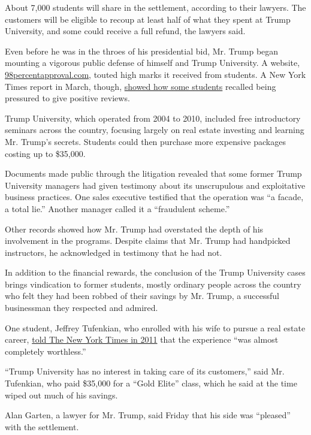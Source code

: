 About 7,000 students will share in the settlement, according to their
lawyers. The customers will be eligible to recoup at least half of what
they spent at Trump University, and some could receive a full refund,
the lawyers said.

Even before he was in the throes of his presidential bid, Mr. Trump
began mounting a vigorous public defense of himself and Trump
University. A website,
\href{http://www.98percentapproval.com/}{98percentapproval.com}, touted
high marks it received from students. A New York Times report in March,
though,
\href{http://www.nytimes.com/2016/03/12/us/politics/donald-trump-trump-university.html}{showed
how some students} recalled being pressured to give positive reviews.

Trump University, which operated from 2004 to 2010, included free
introductory seminars across the country, focusing largely on real
estate investing and learning Mr. Trump's secrets. Students could then
purchase more expensive packages costing up to \$35,000.

Documents made public through the litigation revealed that some former
Trump University managers had given testimony about its unscrupulous and
exploitative business practices. One sales executive testified that the
operation was ``a facade, a total lie.'' Another manager called it a
``fraudulent scheme.''

Other records showed how Mr. Trump had overstated the depth of his
involvement in the programs. Despite claims that Mr. Trump had
handpicked instructors, he acknowledged in testimony that he had not.

In addition to the financial rewards, the conclusion of the Trump
University cases brings vindication to former students, mostly ordinary
people across the country who felt they had been robbed of their savings
by Mr. Trump, a successful businessman they respected and admired.

One student, Jeffrey Tufenkian, who enrolled with his wife to pursue a
real estate career,
\href{http://www.nytimes.com/2011/05/13/nyregion/feeling-deceived-over-homes-that-were-trump-in-name-only.html}{told
The New York Times in 2011} that the experience ``was almost completely
worthless.''

``Trump University has no interest in taking care of its customers,''
said Mr. Tufenkian, who paid \$35,000 for a ``Gold Elite'' class, which
he said at the time wiped out much of his savings.

Alan Garten, a lawyer for Mr. Trump, said Friday that his side was
``pleased'' with the settlement.

